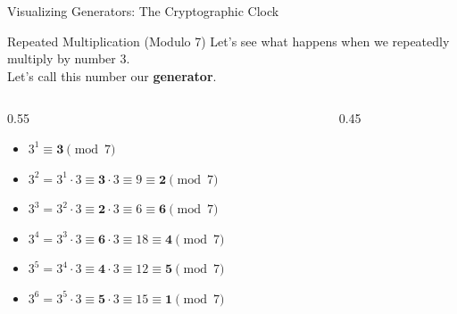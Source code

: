 \documentclass[aspectratio=169, 10pt]{beamer}
\begin{document}
\begin{frame}{Visualizing Generators: The Cryptographic Clock}
    
    \begin{block}{Repeated Multiplication (Modulo 7)}
        Let's see what happens when we repeatedly multiply by number 3. \\
        \vspace{0.1cm}
        Let's call this number our \textbf{generator}.
    \end{block}

    \vspace{0.3cm}
    \begin{columns}[c]
        \begin{column}{0.55\textwidth}
            \begin{itemize}
                \item<1-> $3^1 \equiv \mathbf{3} \pmod 7$
                \vspace{0.1cm}
                \item<2-> $3^2 = 3^1 \cdot 3 \equiv \mathbf{3} \cdot 3 \equiv 9 \equiv \mathbf{2} \pmod 7$
                \vspace{0.1cm}
                \item<3-> $3^3 = 3^2 \cdot 3 \equiv \mathbf{2} \cdot 3 \equiv 6 \equiv \mathbf{6} \pmod 7$
                \vspace{0.1cm}
                \item<4-> $3^4 = 3^3 \cdot 3 \equiv \mathbf{6} \cdot 3 \equiv 18 \equiv \mathbf{4} \pmod 7$
                \vspace{0.1cm}
                \item<5-> $3^5 = 3^4 \cdot 3 \equiv \mathbf{4} \cdot 3 \equiv 12 \equiv \mathbf{5} \pmod 7$
                \vspace{0.1cm}
                \item<6-> $3^6 = 3^5 \cdot 3 \equiv \mathbf{5} \cdot 3 \equiv 15 \equiv \mathbf{1} \pmod 7$
            \end{itemize}
        \end{column}

        \begin{column}{0.45\textwidth}
            \centering
\end{column}
\end{columns}
\end{frame}
\end{document}
